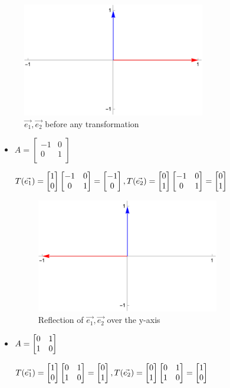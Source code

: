 \documentclass[12pt]{article}
\begin{document}
\begin{figure}[!ht]
    \centering
    \includegraphics[width=8cm]{misc/beforetransformation.png}
    \caption{$\Vec{e_1}, \Vec{e_2}$ before any transformation}
    \label{fig:beforetransform}
\end{figure}
\newpage
\begin{itemize}
    \item $A = \begin{bmatrix}
    -1 &0\\
    0 &1\\
    \end{bmatrix}$ 
    
    $T(\Vec{e_1}) = \begin{bmatrix} 1\\ 0\\ \end{bmatrix} \begin{bmatrix} -1 &0\\ 0 &1\\ \end{bmatrix} = \begin{bmatrix} -1\\ 0\\ \end{bmatrix}, T(\Vec{e_2}) = \begin{bmatrix} 0\\ 1\\ \end{bmatrix} \begin{bmatrix} -1 &0\\ 0 &1\\ \end{bmatrix} = \begin{bmatrix} 0\\ 1\\ \end{bmatrix}$
    
    \begin{figure}[!ht]
        \centering
        \includegraphics[width=8cm]{misc/reflectionoveryaxis.png}
        \caption{Reflection of $\Vec{e_1}, \Vec{e_2}$ over the y-axis}
    \end{figure}
    
    \item $A = \begin{bmatrix} 0 &1\\ 1 &0\\ \end{bmatrix}$ 
    
    $T(\Vec{e_1}) = \begin{bmatrix} 1\\ 0\\ \end{bmatrix} \begin{bmatrix} 0 &1\\ 1 &0\\ \end{bmatrix} = \begin{bmatrix} 0\\ 1\\ \end{bmatrix}, T(\Vec{e_2}) = \begin{bmatrix} 0\\ 1\\ \end{bmatrix} \begin{bmatrix} 0 &1\\ 1 &0\\ \end{bmatrix} = \begin{bmatrix} 1\\ 0\\ \end{bmatrix}$
    

\end{itemize}
\end{document}
